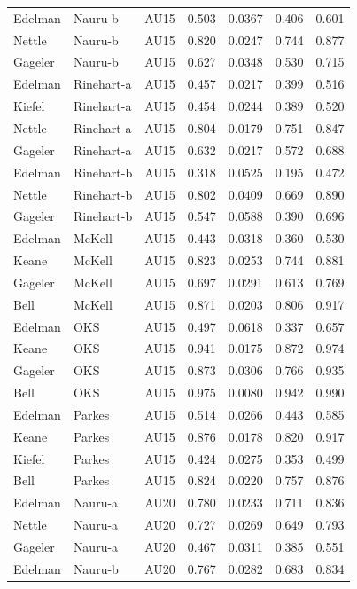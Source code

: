 \documentclass{monashthesis}
\begin{document}
\begin{center}
\begin{longtable}{lllllll}
Edelman & Nauru-b & AU15 & 0.503 & 0.0367 & 0.406 & 0.601 \\
Nettle & Nauru-b & AU15 & 0.820 & 0.0247 & 0.744 & 0.877 \\
Gageler & Nauru-b & AU15 & 0.627 & 0.0348 & 0.530 & 0.715 \\
Edelman & Rinehart-a & AU15 & 0.457 & 0.0217 & 0.399 & 0.516 \\
Kiefel & Rinehart-a & AU15 & 0.454 & 0.0244 & 0.389 & 0.520 \\
Nettle & Rinehart-a & AU15 & 0.804 & 0.0179 & 0.751 & 0.847 \\
Gageler & Rinehart-a & AU15 & 0.632 & 0.0217 & 0.572 & 0.688 \\
Edelman & Rinehart-b & AU15 & 0.318 & 0.0525 & 0.195 & 0.472 \\
Nettle & Rinehart-b & AU15 & 0.802 & 0.0409 & 0.669 & 0.890 \\
Gageler & Rinehart-b & AU15 & 0.547 & 0.0588 & 0.390 & 0.696 \\
Edelman & McKell & AU15 & 0.443 & 0.0318 & 0.360 & 0.530 \\
Keane & McKell & AU15 & 0.823 & 0.0253 & 0.744 & 0.881 \\
Gageler & McKell & AU15 & 0.697 & 0.0291 & 0.613 & 0.769 \\
Bell & McKell & AU15 & 0.871 & 0.0203 & 0.806 & 0.917 \\
Edelman & OKS & AU15 & 0.497 & 0.0618 & 0.337 & 0.657 \\
Keane & OKS & AU15 & 0.941 & 0.0175 & 0.872 & 0.974 \\
Gageler & OKS & AU15 & 0.873 & 0.0306 & 0.766 & 0.935 \\
Bell & OKS & AU15 & 0.975 & 0.0080 & 0.942 & 0.990 \\
Edelman & Parkes & AU15 & 0.514 & 0.0266 & 0.443 & 0.585 \\
Keane & Parkes & AU15 & 0.876 & 0.0178 & 0.820 & 0.917 \\
Kiefel & Parkes & AU15 & 0.424 & 0.0275 & 0.353 & 0.499 \\
Bell & Parkes & AU15 & 0.824 & 0.0220 & 0.757 & 0.876 \\
Edelman & Nauru-a & AU20 & 0.780 & 0.0233 & 0.711 & 0.836 \\
Nettle & Nauru-a & AU20 & 0.727 & 0.0269 & 0.649 & 0.793 \\
Gageler & Nauru-a & AU20 & 0.467 & 0.0311 & 0.385 & 0.551 \\
Edelman & Nauru-b & AU20 & 0.767 & 0.0282 & 0.683 & 0.834 \\

\end{longtable}
\end{center}
\end{document}
